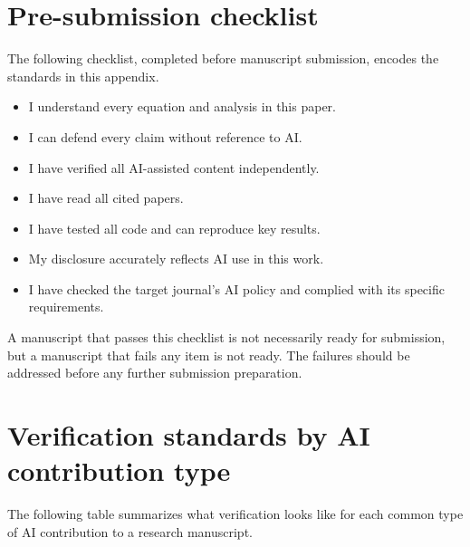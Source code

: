\documentclass{SIAMbook2023}
\begin{document}
\section{Pre-submission checklist}
\label{app:sciwriting-checklist}%

The following checklist, completed before manuscript submission, encodes the standards in this appendix.

\begin{itemize}[label=$\square$]
\item I understand every equation and analysis in this paper.
\item I can defend every claim without reference to AI.
\item I have verified all AI-assisted content independently.
\item I have read all cited papers.
\item I have tested all code and can reproduce key results.
\item My disclosure accurately reflects AI use in this work.
\item I have checked the target journal's AI policy and complied with its specific requirements.
\end{itemize}

A manuscript that passes this checklist is not necessarily ready for submission, but a manuscript that fails any item is not ready. The failures should be addressed before any further submission preparation.

\section{Verification standards by AI contribution type}

The following table summarizes what verification looks like for each common type of AI contribution to a research manuscript.
\end{document}
